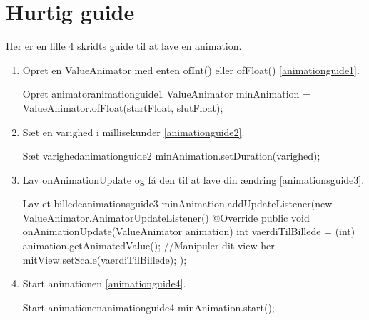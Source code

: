\section{Hurtig guide}
Her er en lille 4 skridts guide til at lave en animation.
\begin{enumerate}
	\item Opret en ValueAnimator med enten ofInt() eller ofFloat() \autoref{animationguide1}.
	\begin{JavaCode}{Opret animator}{animationguide1}
	ValueAnimator minAnimation = ValueAnimator.ofFloat(startFloat, slutFloat);
	\end{JavaCode}
	\item Sæt en varighed i millisekunder \autoref{animationguide2}.
	\begin{JavaCode}{Sæt varighed}{animationguide2}
	minAnimation.setDuration(varighed);
	\end{JavaCode}
	\item Lav onAnimationUpdate og få den til at lave din ændring \autoref{animationsguide3}.
	\begin{JavaCode}{Lav et billede}{animationsguide3}
		minAnimation.addUpdateListener(new ValueAnimator.AnimatorUpdateListener() {
			@Override
			public void onAnimationUpdate(ValueAnimator animation) {
				int vaerdiTilBillede = (int) animation.getAnimatedValue();
				//Manipuler dit view her
				mitView.setScale(vaerdiTilBillede);
			}
		});
	\end{JavaCode}
	\item Start animationen \autoref{animationguide4}.
	\begin{JavaCode}{Start animationen}{animationguide4}
		minAnimation.start();
	\end{JavaCode}
\end{enumerate}

